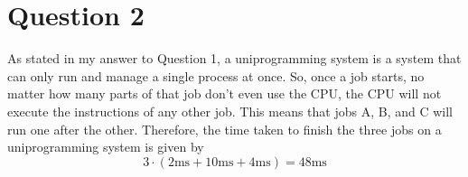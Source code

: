 \documentclass[11pt, letterpaper]{article}
\begin{document}
\newpage

\section*{Question 2}

As stated in my answer to Question 1, a uniprogramming system is a system that can only run and manage a single process at once.  So, once a job starts, no matter how many parts of that job don't even use the CPU, the CPU will not execute the instructions of any other job.  This means that jobs A, B, and C will run one after the other.  Therefore, the time taken to finish the three jobs on a uniprogramming system is given by $$3 \cdot (2\text{ms} + 10\text{ms} + 4\text{ms}) = 48\text{ms}$$
\end{document}
